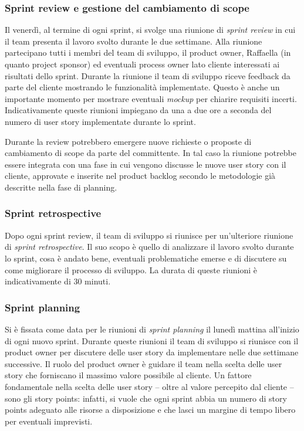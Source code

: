 \subsubsection{Sprint review e gestione del cambiamento di scope}
Il venerdì, al termine di ogni sprint, si svolge una riunione di \emph{sprint review} in cui il team presenta il lavoro svolto durante le due settimane. Alla riunione partecipano tutti i membri del team di sviluppo, il product owner, Raffaella (in quanto project sponsor) ed eventuali process owner lato cliente interessati ai risultati dello sprint.
Durante la riunione il team di sviluppo riceve feedback da parte del cliente mostrando le funzionalità implementate. Questo è anche un importante momento per mostrare eventuali \emph{mockup} per chiarire requisiti incerti.
Indicativamente queste riunioni impiegano da una a due ore a seconda del numero di user story implementate durante lo sprint.

Durante la review potrebbero emergere nuove richieste o proposte di cambiamento di scope da parte del  committente. In tal caso la riunione potrebbe essere integrata con una fase in cui vengono discusse le nuove user story con il cliente, approvate e inserite nel product backlog secondo le metodologie già descritte nella fase di planning.

\subsubsection{Sprint retrospective}
Dopo ogni sprint review, il team di sviluppo si riunisce per un'ulteriore riunione di \emph{sprint retrospective}. Il suo scopo è quello di analizzare il lavoro svolto durante lo sprint, cosa è andato bene, eventuali problematiche emerse e di discutere su come migliorare il processo di sviluppo.
La durata di queste riunioni è indicativamente di 30 minuti.

\subsubsection{Sprint planning}
Si è fissata come data per le riunioni di \emph{sprint planning} il lunedì mattina all'inizio di ogni nuovo sprint. Durante queste riunioni il team di sviluppo si riunisce con il product owner per discutere delle user story da implementare nelle due settimane successive. Il ruolo del product owner è guidare il team nella scelta delle user story che forniscano il massimo valore possibile al cliente. Un fattore fondamentale nella scelta delle user story -- oltre al valore percepito dal cliente -- sono gli story points: infatti, si vuole che ogni sprint abbia un numero di story points adeguato alle risorse a disposizione e che lasci un margine di tempo libero per eventuali imprevisti.

